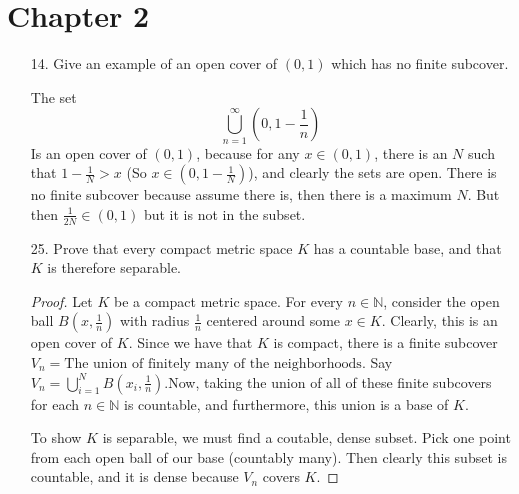 \documentclass[hidelinks,12pt]{article}
\title{\scalebox{1.5}{Math 724 Homework 2}}
\author{\scalebox{1.5}{Theo Koss}}
\date{September 2024}
\newcommand{\N}{\mathbb{N}}
\begin{document}
\maketitle
\section*{Chapter 2}
\begin{enumerate}
    \item[14.] Give an example of an open cover of \((0,1)\) which has no finite subcover.
        \par\null\par The set \[
        \bigcup_{n=1}^{\infty}(0,1-\frac{1}{n})
        \]
        Is an open cover of \((0,1)\), because for any \(x\in(0,1)\), there is an \(N\) such that \(1-\frac{1}{N}>x\) (So \(x\in(0,1-\frac{1}{N})\)), and clearly the sets are open. There is no finite subcover because assume there is, then there is a maximum \(N\). But then \(\frac{1}{2N}\in(0,1)\) but it is not in the subset.
    \item[25.] Prove that every compact metric space \(K\) has a countable base, and that \(K\) is therefore separable.
        \begin{proof}
            Let \(K\) be a compact metric space. For every \(n\in\N\), consider the open ball \(B(x,\frac{1}{n})\) with radius \(\frac{1}{n}\) centered around some \(x\in K\). Clearly, this is an open cover of \(K\). Since we have that \(K\) is compact, there is a finite subcover \(V_{n}=\text{The union of finitely many of the neighborhoods}\). Say \(V_{n}=\bigcup_{i=1}^{N}B(x_{i},\frac{1}{n})\).Now, taking the union of all of these finite subcovers for each \(n\in\N\) is countable, and furthermore, this union is a base of \(K\). \par\null\par To show \(K\) is separable, we must find a coutable, dense subset. Pick one point from each open ball of our base (countably many). Then clearly this subset is countable, and it is dense because \(V_{n}\) covers \(K\).
        \end{proof}
\end{enumerate}
\end{document}
